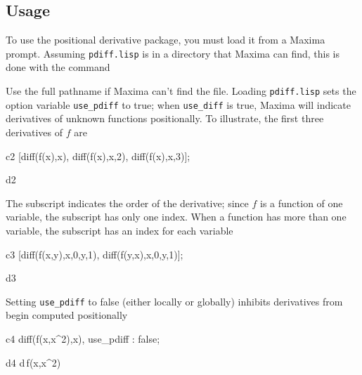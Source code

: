 \documentclass[12pt]{article}
\begin{document}
\subsection*{Usage}

To use the positional derivative package, you must load it from
a Maxima prompt.  Assuming {\tt pdiff.lisp} is in a directory that 
Maxima can find, this is done with the command




\noindent Use the full pathname if Maxima can't find the file. Loading 
{\tt pdiff.lisp} sets the option variable {\tt use\_pdiff} to true; 
when {\tt use\_diff} is true, Maxima will 
indicate derivatives of  unknown functions positionally. To illustrate, 
the first three  derivatives of $f$ are


\begin{mcline}{c2}
[diff(f(x),x),
  diff(f(x),x,2),
  diff(f(x),x,3)];
\end{mcline}



\begin{mdline}{d2}
\end{mdline}

The subscript indicates the order of the derivative;  since $f$ is a function of 
one variable, the subscript has only one index.  When a function has more 
than one variable, the subscript has an index for each variable


\begin{mcline}{c3}
     [diff(f(x,y),x,0,y,1), diff(f(y,x),x,0,y,1)];
\end{mcline}

\begin{mdline}{d3}
\end{mdline}

\noindent Setting {\tt use\_pdiff} to false  (either locally or globally) inhibits 
derivatives from begin computed positionally


\begin{mcline}{c4}
      diff(f(x,x^2),x), use_pdiff : false;
\end{mcline}



\begin{mdline}{d4}
   {{d}}\,f\left(x,x^2\right)
\end{mdline}
\end{document}

